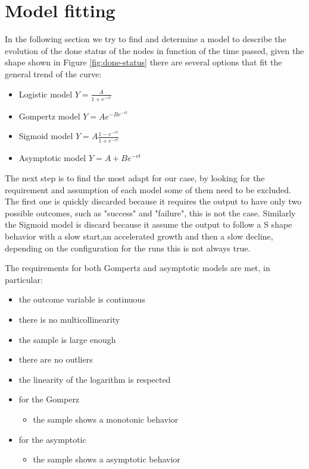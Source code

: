 \section{Model fitting} \label{sec:ModelFitting}
In the following section we try to find and determine a model to describe the evolution of the done status of the nodes in function of the time passed, given the shape shown in Figure \ref{fig:done-status} there are several options that fit the general trend of the curve:

\begin{itemize}
	\item Logistic model $ Y = \frac{A}{1 + e^{-rt}} $
	\item Gompertz model $ Y = Ae^{-Be^{-rt}} $
	\item Sigmoid model $ Y = A\frac{1-e^{-rt}}{1+e^{-rt}}$
	\item Asymptotic model $ Y = A + Be^{-rt}$
\end{itemize} 

The next step is to find the most adapt for our case, by looking for the requirement and assumption of each model some of them need to be excluded. The first one is quickly discarded because it requires the output to have only two possible outcomes, such as "success" and "failure", this is not the case.
Similarly the Sigmoid model is discard because it assume the output to follow a S shape behavior with a slow start,an accelerated growth and then a slow decline, depending on the configuration for the runs this is not always true.


The requirements for both Gompertz and asymptotic models are met, in particular:
\begin{itemize}
	\item the outcome variable is continuous
	\item there is no multicollinearity
	\item the sample is large enough
	\item there are no outliers
	\item the linearity of the logarithm is respected
	
	\item for the Gomperz
		\begin{itemize}
			\item the sample shows a monotonic behavior
		\end{itemize}
		\item for the asymptotic
		\begin{itemize}
			\item the sample shows a asymptotic behavior
		\end{itemize}
\end{itemize}

